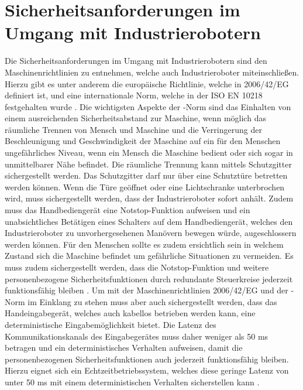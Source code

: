 \section{Sicherheitsanforderungen im Umgang mit Industrierobotern}
Die Sicherheitsanforderungen im Umgang mit Industrierobotern sind den Maschinenrichtlinien zu entnehmen, welche auch Industrieroboter miteinschließen. Hierzu gibt es unter anderem die europäische Richtlinie, welche in 2006/42/EG definiert ist, und eine internationale Norm, welche in der ISO EN 10218 festgehalten wurde \cite{industrieroboter_2020}. Die wichtigsten Aspekte der -Norm sind das Einhalten von einem ausreichenden Sicherheitsabstand zur Maschine, wenn möglich das räumliche Trennen von Mensch und Maschine und die Verringerung der Beschleunigung und Geschwindigkeit der Maschine auf ein für den Menschen ungefährliches Niveau, wenn ein Mensch die Maschine bedient oder sich sogar in unmittelbarer Nähe befindet. Die räumliche Trennung kann mittels Schutzgitter sichergestellt werden. Das Schutzgitter darf nur über eine Schutztüre betretten werden können. Wenn die Türe geöffnet oder eine Lichtschranke unterbrochen wird, muss sichergestellt werden, dass der Industrieroboter sofort anhält. Zudem muss das Handbediengerät eine Notstop-Funktion aufweisen und ein unabsichtliches Betätigen eines Schalters auf dem Handbediengerät, welches den Industrieroboter zu unvorhergesehenen Manövern bewegen würde, augeschlossern werden können. Für den Menschen sollte es zudem ersichtlich sein in welchem Zustand sich die Maschine befindet um gefährliche Situationen zu vermeiden. Es muss zudem sichergestellt werden, dass die Notstop-Funktion und weitere personenbezogene Sicherheitsfunktionen durch redundante Steuerkreise jederzeit funktionsfähig bleiben \cite{behnisch_iso_2008}. Um mit der Maschinenrichtlinien 2006/42/EG und der -Norm im Einklang zu stehen muss aber auch sichergestellt werden, dass das Handeingabegerät, welches auch kabellos betrieben werden kann, eine deterministische Eingabemöglichkeit bietet. Die Latenz des Kommunikationskanals des Eingabegerätes muss daher weniger als 50 ms betragen und ein deterministisches Verhalten aufweisen, damit die personenbezogenen Sicherheitsfunktionen auch jederzeit funktionsfähig bleiben. Hierzu eignet sich ein Echtzeitbetriebssystem, welches diese geringe Latenz von unter 50 ms mit einem deterministischen Verhalten sicherstellen kann \cite[55]{prassler_advances_2004}.

